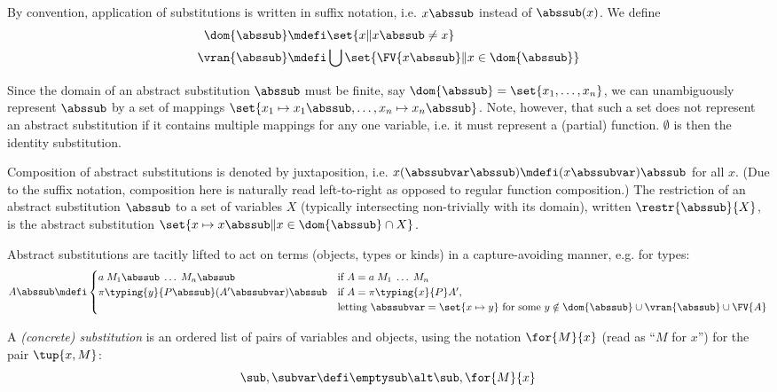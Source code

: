 By convention, application of substitutions is written in suffix notation, i.e. $x \abssub$ instead of $\abssub(x)$.
We define
\begin{align*}
  \dom{\abssub} &\mdefi \set{x \| x \abssub \neq x} \\
  \vran{\abssub} &\mdefi \bigcup{\set{\FV{x \abssub} \| x \in \dom{\abssub}}}
\end{align*}

Since the domain of an abstract substitution $\abssub$ must be finite, say $\dom{\abssub} = \set{x_1, \ldots, x_n}$, we can unambiguously represent $\abssub$ by a set of mappings $\set{x_1 \mapsto x_1 \abssub, \ldots, x_n \mapsto x_n \abssub}$.
Note, however, that such a set does not represent an abstract substitution if it contains multiple mappings for any one variable, i.e. it must represent a (partial) function.
$\emptyset$ is then the identity substitution.

Composition of abstract substitutions is denoted by juxtaposition, i.e. $x (\abssubvar \abssub) \mdefi (x \abssubvar) \abssub$ for all $x$.
(Due to the suffix notation, composition here is naturally read left-to-right as opposed to regular function composition.)
The restriction of an abstract substitution $\abssub$ to a set of variables $X$ (typically intersecting non-trivially with its domain), written $\restr{\abssub}{X}$, is the abstract substitution $\set{x \mapsto x \abssub \| x \in \dom{\abssub} \cap X}$.

Abstract substitutions are tacitly lifted to act on terms (objects, types or kinds) in a capture-avoiding manner, e.g. for types:
\[ A \abssub \mdefi
  \begin{cases}
    a \; M_1 \abssub \; \ldots \; M_n \abssub           & \text{if $A = a \; M_1 \; \ldots \; M_n$} \\
    \pi{\typing{y}{P \abssub}}{(A' \abssubvar) \abssub} & \text{if $A = \pi{\typing{x}{P}}{A'}$,} \\
                                                        & \text{letting $\abssubvar = \set{x \mapsto y}$ for some $y \notin \dom{\abssub} \cup \vran{\abssub} \cup \FV{A}$}
  \end{cases}
\]

\begin{definition}
\label{def:concrete-substitution}
A \emph{(concrete) substitution} is an ordered list of pairs of variables and objects, using the notation $\for{M}{x}$ (read as ``$M$ for $x$'') for the pair $\tup{x, M}$:
\[ \sub, \subvar \defi \emptysub \alt \sub, \for{M}{x} \]
\end{definition}

